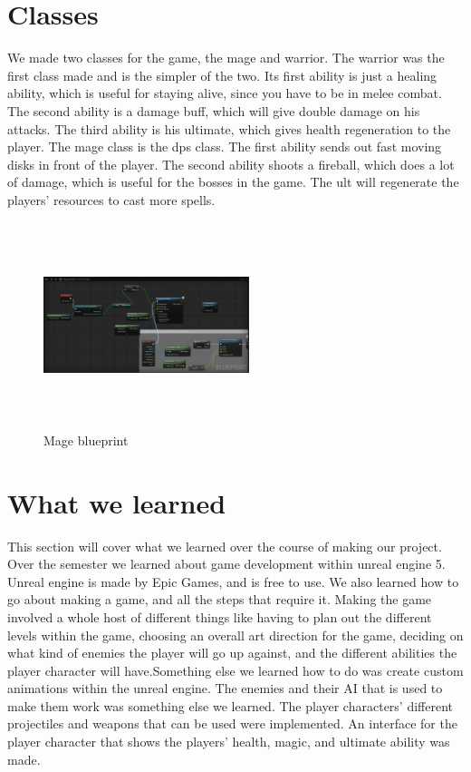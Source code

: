 \documentclass{sigchi}
\begin{document}
\section{Classes}
We made two classes for the game, the mage and warrior. The warrior was the first class made and is the simpler of the two. Its first ability is just a healing ability, which is useful for staying alive, since you have to be in melee combat. The second ability is a damage buff, which will give double damage on his attacks. The third ability is his ultimate, which gives health regeneration to the player. The mage class is the dps class. The first ability sends out fast moving disks in front of the player. The second ability shoots a fireball, which does a lot of damage, which is useful for the bosses in the game. The ult will regenerate the players' resources to cast more spells. 
\begin{figure}


\includegraphics[width=6cm, height=6cm]{Figure/MageAbility.png}
\caption{Mage blueprint}
\end{figure}

\section{What we learned}
This section will cover what we learned over the course of  making our project. Over the semester we learned about game development within unreal engine 5. Unreal engine is made by Epic Games, and is free to use. We also learned how to go about making a game, and all the steps that require it. Making the game involved a whole host of different things like having to plan out the different levels within the game, choosing an overall art direction for the game, deciding on what kind of enemies the player will go up against, and the different abilities the player character will have.Something else we learned how to do was create custom animations within the unreal engine. The enemies and their AI that is used to make them work was something else we learned. The player characters' different projectiles and weapons that can be used were implemented. An interface for the player character that shows the players' health, magic, and ultimate ability was made.
\end{document}
